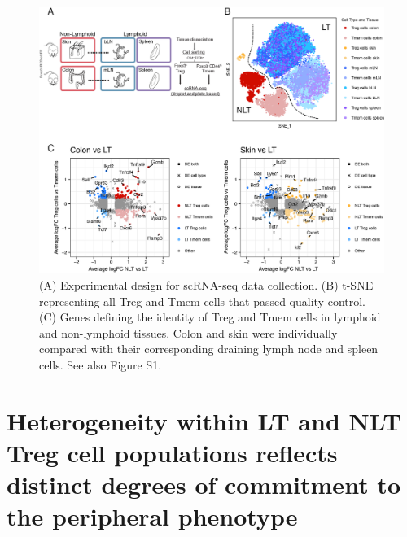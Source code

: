 \begin{figure}[htbp!] 
\centering    
\includegraphics[width=1.0\textwidth]{Chapter2/chap2_fig1.png} %
\caption[chap2fig1]{(A) Experimental design for scRNA-seq data collection. (B) t-SNE representing all Treg and Tmem cells that passed quality control. (C) Genes defining the identity of Treg and Tmem cells in lymphoid and non-lymphoid tissues. Colon and skin were individually compared with their corresponding draining lymph node and spleen cells. See also Figure S1.}
\label{fig:chap2_fig1}
\end{figure}



\section[Results2]{Heterogeneity within LT and NLT Treg cell populations reflects distinct degrees of commitment to the peripheral phenotype}
\label{section2.3}

